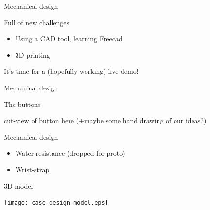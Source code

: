 \documentclass[compress,red]{beamer}
\begin{document}
\begin{frame}{Mechanical design}

  Full of new challenges

  \begin{itemize}
  \item Using a CAD tool, learning Freecad
  \item 3D printing
  \end{itemize}

  It's time for a (hopefully working) live demo!


\end{frame}

\begin{frame}{Mechanical design}

  The buttons

  \begin{center}
    cut-view of button here (+maybe some hand drawing of our ideas?)
  \end{center}

  \note[item]{}

\end{frame}

\begin{frame}{Mechanical design}

  \begin{itemize}
  \item Water-resistance (dropped for proto)
  \item Wrist-strap
  \end{itemize}


\end{frame}

\begin{frame}{3D model}

  \begin{center}
    \texttt{[image: case-design-model.eps]}
  \end{center}
\end{frame}
\end{document}
